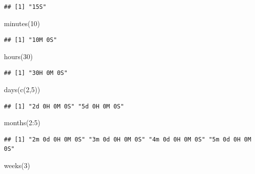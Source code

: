 \documentclass[
]{book}
\newenvironment{Shaded}{\begin{snugshade}}{\end{snugshade}}
\newcommand{\DecValTok}[1]{\textcolor[rgb]{0.00,0.00,0.81}{#1}}
\newcommand{\FunctionTok}[1]{\textcolor[rgb]{0.00,0.00,0.00}{#1}}
\newcommand{\NormalTok}[1]{#1}
\newcommand{\SpecialCharTok}[1]{\textcolor[rgb]{0.00,0.00,0.00}{#1}}
\begin{document}
\begin{verbatim}
## [1] "15S"
\end{verbatim}

\begin{Shaded}
\begin{Highlighting}[]
\FunctionTok{minutes}\NormalTok{(}\DecValTok{10}\NormalTok{)}
\end{Highlighting}
\end{Shaded}

\begin{verbatim}
## [1] "10M 0S"
\end{verbatim}

\begin{Shaded}
\begin{Highlighting}[]
\FunctionTok{hours}\NormalTok{(}\DecValTok{30}\NormalTok{)}
\end{Highlighting}
\end{Shaded}

\begin{verbatim}
## [1] "30H 0M 0S"
\end{verbatim}

\begin{Shaded}
\begin{Highlighting}[]
\FunctionTok{days}\NormalTok{(}\FunctionTok{c}\NormalTok{(}\DecValTok{2}\NormalTok{,}\DecValTok{5}\NormalTok{))}
\end{Highlighting}
\end{Shaded}

\begin{verbatim}
## [1] "2d 0H 0M 0S" "5d 0H 0M 0S"
\end{verbatim}

\begin{Shaded}
\begin{Highlighting}[]
\FunctionTok{months}\NormalTok{(}\DecValTok{2}\SpecialCharTok{:}\DecValTok{5}\NormalTok{)}
\end{Highlighting}
\end{Shaded}

\begin{verbatim}
## [1] "2m 0d 0H 0M 0S" "3m 0d 0H 0M 0S" "4m 0d 0H 0M 0S" "5m 0d 0H 0M 0S"
\end{verbatim}

\begin{Shaded}
\begin{Highlighting}[]
\FunctionTok{weeks}\NormalTok{(}\DecValTok{3}\NormalTok{)}
\end{Highlighting}
\end{Shaded}
\end{document}
